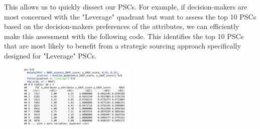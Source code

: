 \documentclass[twocolumn]{svjour3}       %
\begin{document}
This allows us to quickly dissect our PSCs. For example, if decision-makers are most concerned with the "Leverage" quadrant but want to assess the top 10 PSCs based on the decision-makers preferences of the attributes, we can efficiently make this assessment with the following code. This identifies the top 10 PSCs that are most likely to benefit from a strategic sourcing approach specifically designed for "Leverage" PSCs.
\begin{figure}[!htb]
  \includegraphics[width=0.5\textwidth]{code12.png}
\end{figure}
\end{document}

